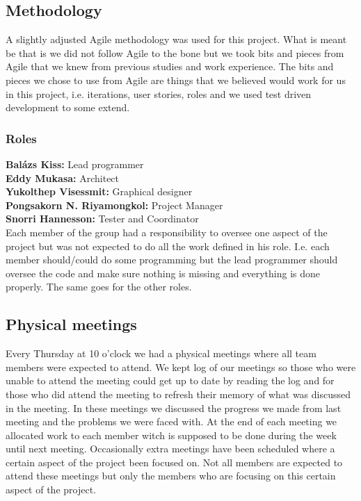 \documentclass[11pt]{article}
\begin{document}
\subsection{Methodology}
A slightly adjusted Agile methodology was used for this project. What is meant be that is we did not follow Agile to the bone but we took bits and pieces from Agile that we knew from previous studies and work experience. The bits and pieces we chose to use from Agile are things that we believed would work for us in this project, i.e. iterations, user stories, roles and we used test driven development to some extend.
\subsubsection{Roles}
\textbf{Balázs Kiss:} Lead programmer\\
\textbf{Eddy Mukasa:} Architect \\
\textbf{Yukolthep Visessmit:} Graphical designer \\
\textbf{Pongsakorn N. Riyamongkol:} Project Manager \\
\textbf{Snorri Hannesson:} Tester and Coordinator \\ \newline
Each member of the group had a responsibility to oversee one aspect of the project but was not expected to do all the work defined in his role. I.e. each member should/could do some programming but the lead programmer should oversee the code and make sure nothing is missing and everything is done properly. The same goes for the other roles.

\subsection{Physical meetings}
Every Thursday at 10 o'clock we had a physical meetings where all team members were expected to attend. We kept log of our meetings so those who were unable to attend the meeting could get up to date by reading the log and for those who did attend the meeting to refresh their memory of what was discussed in the meeting.
In these meetings we discussed the progress we made from last meeting and the problems we were faced with. At the end of each meeting we allocated work to each member witch is supposed to be done during the week until next meeting.
Occasionally extra meetings have been scheduled where a certain aspect of the project been focused on. Not all members are expected to attend these meetings but only the members who are focusing on this certain aspect of the project.
\end{document}
